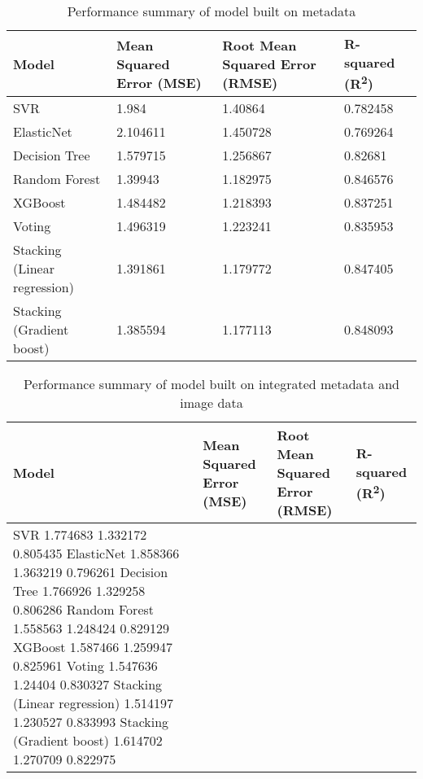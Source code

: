 \begin{longtable}{| p{} | p{} | p{} | p{} |}
    \caption{Performance summary of model built on metadata}
    \label{tab:simple_models} \\
    \hline
    Model &
    Mean Squared Error \newline(MSE) &
    Root Mean Squared Error \newline (RMSE) &
    R-squared (R\textsuperscript{2}) \\
    \hline
    SVR &
    1.984 &
    1.40864 &
    0.782458 \\
    \hline
    ElasticNet &
    2.104611 &
    1.450728 &
    0.769264 \\
    \hline
    Decision Tree &
    1.579715 &
    1.256867 &
    0.82681 \\
    \hline
    Random Forest &
    1.39943 &
    1.182975 &
    0.846576 \\
    \hline
    XGBoost &
    1.484482 &
    1.218393 &
    0.837251 \\
    \hline
    Voting &
    1.496319 &
    1.223241 &
    0.835953 \\
    \hline
    Stacking \newline(Linear regression) &
    1.391861 &
    1.179772 &
    0.847405 \\
    \hline
    Stacking \newline(Gradient boost) &
    1.385594 &
    1.177113 &
    0.848093 \\
    \hline
\end{longtable}

\begin{longtable}{| p{} | p{} | p{} | p{} |}
    \caption{Performance summary of model built on integrated metadata and image data}
    \label{tab:pca_models} \\
    \hline
    Model &
    Mean Squared Error \newline(MSE) &
    Root Mean Squared Error \newline (RMSE) &
    R-squared (R\textsuperscript{2}) \\
    \hline
    SVR
    1.774683
    1.332172
    0.805435
    \hline
    ElasticNet
    1.858366
    1.363219
    0.796261
    \hline
    Decision Tree
    1.766926
    1.329258
    0.806286
    \hline
    Random Forest
    1.558563
    1.248424
    0.829129
    \hline
    XGBoost
    1.587466
    1.259947
    0.825961
    \hline
    Voting
    1.547636
    1.24404
    0.830327
    \hline
    Stacking \newline(Linear regression)
    1.514197
    1.230527
    0.833993
    \hline
    Stacking \newline(Gradient boost)
    1.614702
    1.270709
    0.822975
    \hline
\end{longtable}









